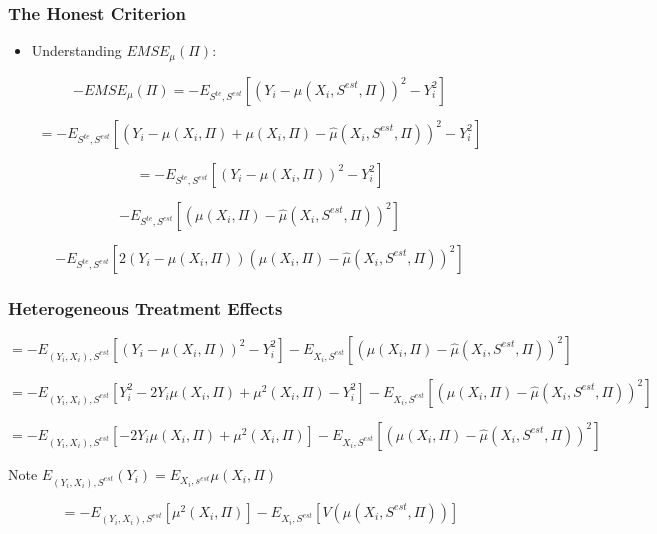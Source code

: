 \documentclass[
  shownotes,
  xcolor={svgnames},
  hyperref={colorlinks,citecolor=DarkBlue,linkcolor=DarkRed,urlcolor=DarkBlue}
  , aspectratio=169]{beamer}
\begin{document}
\begin{frame}[fragile]
\frametitle{The Honest Criterion}

\begin{itemize}
  \item Understanding $EMSE_{\mu}(\Pi)$:
\end{itemize}
\begin{equation}
-EMSE_{\mu}(\Pi)=-E_{S^{te},S^{est}}\left[\left(Y_{i}-\hat{\mu}(X_{i},S^{est},\Pi)\right)^{2}-Y_{i}^{2}\right]
\end{equation}

\[
=-E_{S^{te},S^{est}}\left[\left(Y_{i}-\mu(X_{i},\Pi)+\mu(X_{i},\Pi)-\hat{\mu}(X_{i},S^{est},\Pi)\right)^{2}-Y_{i}^{2}\right]
\]

\[
=-E_{S^{te},S^{est}}\left[\left(Y_{i}-\mu(X_{i},\Pi)\right)^{2}-Y_{i}^{2}\right]
\]

\[
-E_{S^{te},S^{est}}\left[\left(\mu(X_{i},\Pi)-\hat{\mu}(X_{i},S^{est},\Pi)\right)^{2}\right]
\]

\[
-E_{S^{te},S^{est}}\left[2\left(Y_{i}-\mu(X_{i},\Pi)\right)\left(\mu(X_{i},\Pi)-\hat{\mu}(X_{i},S^{est},\Pi)\right)^{2}\right]
\]

\end{frame}
\begin{frame}[fragile]
\frametitle{Heterogeneous Treatment Effects}




\[
=-E_{(Y_{i},X_{i}),S^{est}}\left[\left(Y_{i}-\mu(X_{i},\Pi)\right)^{2}-Y_{i}^{2}\right]-E_{X_{i},S^{est}}\left[\left(\mu(X_{i},\Pi)-\hat{\mu}(X_{i},S^{est},\Pi)\right)^{2}\right]
\]

\[
=-E_{(Y_{i},X_{i}),S^{est}}\left[Y_{i}^{2}-2Y_{i}\mu(X_{i},\Pi)+\mu^{2}(X_{i},\Pi)-Y_{i}^{2}\right]-E_{X_{i},S^{est}}\left[\left(\mu(X_{i},\Pi)-\hat{\mu}(X_{i},S^{est},\Pi)\right)^{2}\right]
\]

\[
=-E_{(Y_{i},X_{i}),S^{est}}\left[-2Y_{i}\mu(X_{i},\Pi)+\mu^{2}(X_{i},\Pi)\right]-E_{X_{i},S^{est}}\left[\left(\mu(X_{i},\Pi)-\hat{\mu}(X_{i},S^{est},\Pi)\right)^{2}\right]
\]



Note $E_{(Y_{i},X_{i}),S^{est}}(Y_{i})=E_{X_{i},s^{est}}\mu(X_{i},\Pi)$

\[
=-E_{(Y_{i},X_{i}),S^{est}}\left[\mu^{2}(X_{i},\Pi)\right]-E_{X_{i},S^{est}}\left[V(\hat{\mu}(X_{i},S^{est},\Pi))\right]
\]



\end{frame}
\end{document}
